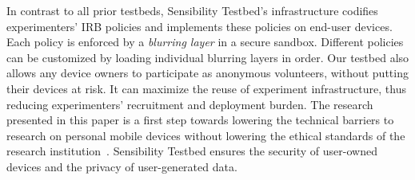 In contrast to all prior testbeds, Sensibility Testbed's
infrastructure codifies experimenters' IRB policies and 
implements these policies on end-user devices. Each 
policy is enforced by a \textit{blurring layer} in a secure 
sandbox. Different policies can be customized by loading
individual blurring layers in order. Our testbed also allows
any device owners to participate as anonymous volunteers,
without putting their devices at risk. It can 
maximize the reuse of experiment infrastructure, thus reducing 
experimenters' recruitment and deployment burden. 
%
%
%
%
%					
The research presented in this paper is a first step towards lowering the technical
barriers to research on personal mobile devices without lowering the
ethical standards of the research institution~\cite{zevenbergen2013ethical}. 
Sensibility Testbed ensures the security of user-owned devices and the 
privacy of user-generated data.  
%
